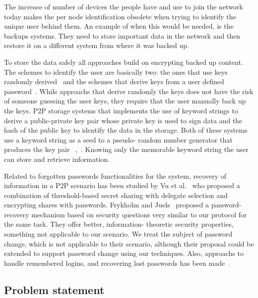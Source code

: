\documentclass[12pt,spanish]{article}
\begin{document}
The increase of number of devices the people have and use to join the network
today makes the per node identification obsolete when trying to identify the
unique user behind them. An example of when this would be needed, is the
backups systems. They need to store important data in the network and then
restore it on a different system from where it was backed up.

To store the data safely all approaches build on encrypting backed up content.
The schemes to identify the user are basically two: the ones that
use keys randomly derived~\cite{Lillibridge:2003:CIB:1247340.1247343} and the schemes that derive
keys from a user defined password~\cite{Cox:2002:PMB:844128.844155}. While
approachs that derive randomly the keys does not have the risk of someone
guessing the user keys, they require that the user manually back up the
keys. 
P2P storage systems that implements the use of keyword strings to derive a
public-private key pair whose private key is used to sign data and the hash of
the public key to identify the data in the storage. Both of
these systems use a keyword string as a seed to a pseudo-
random number generator that produces the key pair ~\cite{clarke2010private},~\cite{Bennett03anencoding}.
Knowing only the memorable keyword string the user can
store and retrieve information.

Related to forgotten passwords functionalities for the system, recovery of
information in a P2P scenario has been studied by Vu et al.~\cite{5380695} who proposed
a combination of threshold-based secret sharing with delegate
selection and encrypting shares with passwords.
Frykholm and Juels~\cite{Frykholm:2001:EPR:501983.501985} proposed a password-recovery
mechanism based on security questions very similar to our
protocol for the same task. They offer better, information-
theoretic security properties, something not applicable to our
scenario. We treat the subject of password change, which is not applicable to
their scenario, although their proposal could be extended to support password
change using our techniques.
Also, approachs to handle
remembered logins, and recovering lost passwords has been
made~\cite{kreitz2012passwords}.

\subsection{Problem statement}
\end{document}
